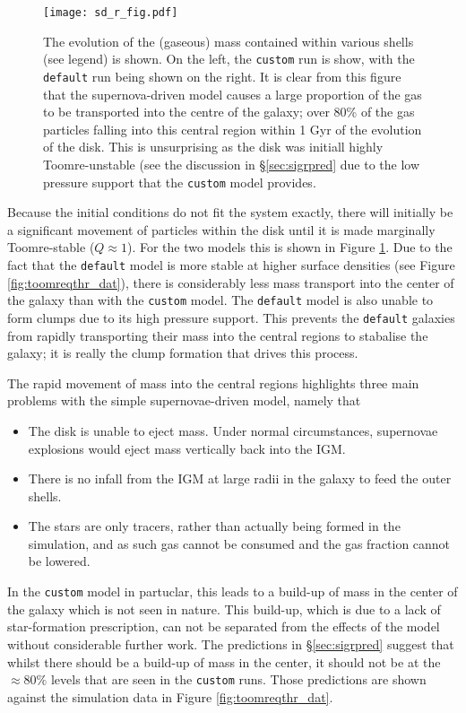 \begin{figure}[!ht]
    \centering
    \texttt{[image: sd\_r\_fig.pdf]}
    \caption{The evolution of the (gaseous) mass contained within various shells (see legend) is shown. On the left, the {\tt custom} run is show, with the {\tt default} run being shown on the right. It is clear from this figure that the supernova-driven model causes a large proportion of the gas to be transported into the centre of the galaxy; over 80\% of the gas particles falling into this central region within 1 Gyr of the evolution of the disk. This is unsurprising as the disk was initiall highly Toomre-unstable (see the discussion in \S \ref{sec:sigrpred} due to the low pressure support that the {\tt custom} model provides.}
    \label{fig:sd_r_evo}
\end{figure}
Because the initial conditions do not fit the system exactly, there will initially be a significant movement of particles within the disk until it is made marginally Toomre-stable ($Q\approx1$).
For the two models this is shown in Figure \ref{fig:sd_r_evo}.
Due to the fact that the {\tt default} model is more stable at higher surface densities (see Figure \ref{fig:toomreqthr_dat}), there is considerably less mass transport into the center of the galaxy than with the {\tt custom} model.
The {\tt default} model is also unable to form clumps due to its high pressure support.
This prevents the {\tt default} galaxies from rapidly transporting their mass into the central regions to stabalise the galaxy; it is really the clump formation that drives this process. 

The rapid movement of mass into the central regions highlights three main problems with the simple supernovae-driven model, namely that
\begin{itemize}
    \item The disk is unable to eject mass. Under normal circumstances, supernovae explosions would eject mass vertically back into the IGM.
    \item There is no infall from the IGM at large radii in the galaxy to feed the outer shells.
    \item The stars are only tracers, rather than actually being formed in the simulation, and as such gas cannot be consumed and the gas fraction cannot be lowered.
\end{itemize}
In the {\tt custom} model in partuclar, this leads to a build-up of mass in the center of the galaxy which is not seen in nature.
This build-up, which is due to a lack of star-formation prescription, can not be separated from the effects of the model without considerable further work.
The predictions in \S \ref{sec:sigrpred} suggest that whilst there should be a build-up of mass in the center, it should not be at the $\approx 80\%$ levels that are seen in the {\tt custom} runs.
Those predictions are shown against the simulation data in Figure \ref{fig:toomreqthr_dat}.

